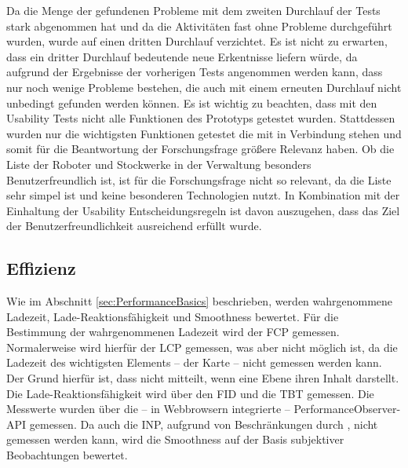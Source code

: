 Da die Menge der gefundenen Probleme mit dem zweiten Durchlauf der Tests stark abgenommen hat und da die Aktivitäten fast ohne Probleme durchgeführt wurden, wurde auf einen dritten Durchlauf verzichtet. Es ist nicht zu erwarten, dass ein dritter Durchlauf bedeutende neue Erkentnisse liefern würde, da aufgrund der Ergebnisse der vorherigen Tests angenommen werden kann, dass nur noch wenige Probleme bestehen, die auch mit einem erneuten Durchlauf nicht unbedingt gefunden werden können. Es ist wichtig zu beachten, dass mit den Usability Tests nicht alle Funktionen des Prototyps getestet wurden. Stattdessen wurden nur die wichtigsten Funktionen getestet die mit \deckgl{} in Verbindung stehen und somit für die Beantwortung der Forschungsfrage größere Relevanz haben. Ob die Liste der Roboter und Stockwerke in der Verwaltung besonders Benutzerfreundlich ist, ist für die Forschungsfrage nicht so relevant, da die Liste sehr simpel ist und keine besonderen Technologien nutzt. In Kombination mit der Einhaltung der Usability Entscheidungsregeln ist davon auszugehen, dass das Ziel der Benutzerfreundlichkeit ausreichend erfüllt wurde.

\subsection{Effizienz}
Wie im Abschnitt \ref{sec:PerformanceBasics} beschrieben, werden wahrgenommene Ladezeit, Lade-Reaktionsfähigkeit und Smoothness bewertet. Für die Bestimmung der wahrgenommenen Ladezeit wird der \ac{FCP} gemessen. Normalerweise wird hierfür der \ac{LCP} gemessen, was aber nicht möglich ist, da die Ladezeit des wichtigsten Elements – der \deckgl{} Karte – nicht gemessen werden kann. Der Grund hierfür ist, dass \deckgl{} nicht mitteilt, wenn eine Ebene ihren Inhalt darstellt. Die Lade-Reaktionsfähigkeit wird über den \ac{FID} und die \ac{TBT} gemessen. Die Messwerte wurden über die – in Webbrowsern integrierte – PerformanceObserver-\ac{API} \cite{PerformanceObserver} gemessen. Da auch die \ac{INP}, aufgrund von Beschränkungen durch \deckgl{}, nicht gemessen werden kann, wird die Smoothness auf der Basis subjektiver Beobachtungen bewertet.



